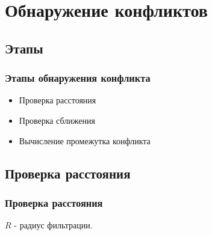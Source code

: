 \documentclass[10pt,t]{beamer}
\begin{document}
\section[Обнаружение конфликтов]{Обнаружение конфликтов}
\subsection[Этапы]{Этапы}
\begin{frame}
\frametitle{Этапы обнаружения конфликта}
\small


\begin{itemize}
	\item Проверка расстояния 
	\item Проверка сближения
	\item Вычисление промежутка конфликта
\end{itemize}

\end{frame}
\subsection[Проверка расстояния]{Проверка расстояния}
\begin{frame}
\frametitle{Проверка расстояния}
\small

\begin{figure}[ht!]
\end{figure}

$R$ - радиус фильтрации.
\end{frame}

\end{document}
